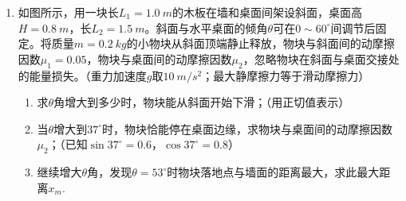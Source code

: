 \begin{enumerate}[leftmargin=0em]
\begin{enumerate}
\end{enumerate}
\begin{figure}[h!]
\flushright

\end{figure}







\item 
{}
如图所示，用一块长$ L_{1} =1.0 \ m $的木板在墙和桌面间架设斜面，桌面高$ H=0.8 \ m $，长$ L_{2} =1.5 \ m $。斜面与水平桌面的倾角$ \theta $可在$ 0 \sim 60 ^{ \circ } $间调节后固定。将质量$ m=0.2 \ kg $的小物块从斜面顶端静止释放，物块与斜面间的动摩擦因数$ \mu _{1}=0.05 $，物块与桌面间的动摩擦因数$ \mu _{2} $，忽略物块在斜面与桌面交接处的能量损失。（重力加速度$ g $取$ 10 \ m/s^{2} $；最大静摩擦力等于滑动摩擦力）
\begin{enumerate}
\renewcommand{\labelenumi}{\arabic{enumi}.}
\item
求$ \theta $角增大到多少时，物块能从斜面开始下滑；（用正切值表示）
\item 
当$ \theta $增大到$ 37 ^{ \circ } $时，物块恰能停在桌面边缘，求物块与桌面间的动摩擦因数$ \mu _{2} $；（已知$ \sin 37 ^{ \circ } =0.6 $，$ \cos 37 ^{ \circ } =0.8 $）
\item 
继续增大$ \theta $角，发现$ \theta =53 ^{ \circ } $时物块落地点与墙面的距离最大，求此最大距离$ x _ m $.




\end{enumerate}
\end{enumerate}
